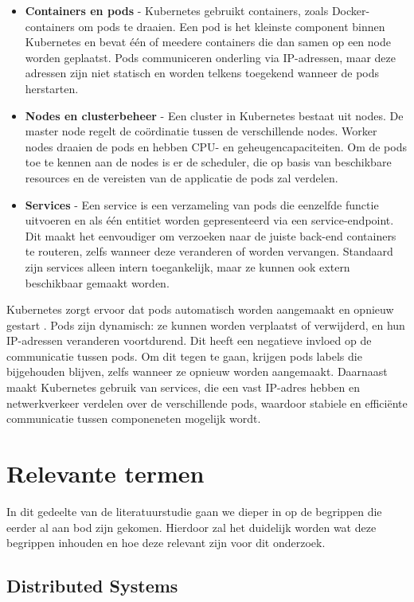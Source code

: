 \begin{itemize}
	\item \textbf{Containers en pods} - Kubernetes gebruikt containers, zoals Docker-containers om pods te draaien. Een pod is het kleinste component binnen Kubernetes en bevat één of meedere containers die dan samen op een node worden geplaatst. Pods communiceren onderling via IP-adressen, maar deze adressen zijn niet statisch en worden telkens toegekend wanneer de pods herstarten.
	\item \textbf{Nodes en clusterbeheer} - Een cluster in Kubernetes bestaat uit nodes. De master node regelt de coördinatie tussen de verschillende nodes. Worker nodes draaien de pods en hebben CPU- en geheugencapaciteiten. Om de pods toe te kennen aan de nodes is er de scheduler, die op basis van beschikbare resources en de vereisten van de applicatie de pods zal verdelen.
	\item \textbf{Services} - Een service is een verzameling van pods die eenzelfde functie uitvoeren en als één entitiet worden gepresenteerd via een service-endpoint. Dit maakt het eenvoudiger om verzoeken naar de juiste back-end containers te routeren, zelfs wanneer deze veranderen of worden vervangen. Standaard zijn services alleen intern toegankelijk, maar ze kunnen ook extern beschikbaar gemaakt worden.
\end{itemize}

Kubernetes zorgt ervoor dat pods automatisch worden aangemaakt en opnieuw gestart \autocite{Vayghan2021}. Pods zijn dynamisch: ze kunnen worden verplaatst of verwijderd, en hun IP-adressen veranderen voortdurend. Dit heeft een negatieve invloed op de communicatie tussen pods. Om dit tegen te gaan, krijgen pods labels die bijgehouden blijven, zelfs wanneer ze opnieuw worden aangemaakt. Daarnaast maakt Kubernetes gebruik van services, die een vast IP-adres hebben en netwerkverkeer verdelen over de verschillende pods, waardoor stabiele en efficiënte communicatie tussen componeneten mogelijk wordt.

\section{Relevante termen}

In dit gedeelte van de literatuurstudie gaan we dieper in op de begrippen die eerder al aan bod zijn gekomen. Hierdoor zal het duidelijk worden wat deze begrippen inhouden en hoe deze relevant zijn voor dit onderzoek.

\subsection{Distributed Systems}
\label{sec:distributed systems}

